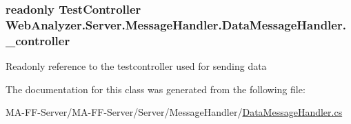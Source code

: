 \subsubsection[{\+\_\+controller}]{\setlength{\rightskip}{0pt plus 5cm}readonly {\bf Test\+Controller} Web\+Analyzer.\+Server.\+Message\+Handler.\+Data\+Message\+Handler.\+\_\+controller\hspace{0.3cm}{\ttfamily [private]}}\label{class_web_analyzer_1_1_server_1_1_message_handler_1_1_data_message_handler_ae67a8ffd73f0ae8ff422db335a7e7924}


Readonly reference to the testcontroller used for sending data 



The documentation for this class was generated from the following file\+:\begin{DoxyCompactItemize}
\item 
M\+A-\/\+F\+F-\/\+Server/\+M\+A-\/\+F\+F-\/\+Server/\+Server/\+Message\+Handler/\hyperlink{_data_message_handler_8cs}{Data\+Message\+Handler.\+cs}\end{DoxyCompactItemize}
